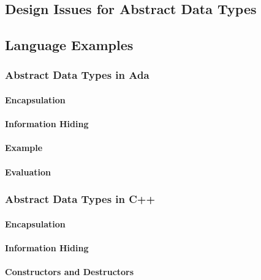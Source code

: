 \subsection{Design Issues for Abstract Data Types}\label{subsec:Abstract_Data_Type_Design_Issues}

\subsection{Language Examples}\label{subsec:Abstract_Data_Type_Lang_Examples}
\subsubsection{Abstract Data Types in Ada}\label{subsubsec:Abstract_Data_Types_Ada}
\paragraph{Encapsulation}\label{par:Ada_Encapsulation}
\paragraph{Information Hiding}\label{par:Ada_Info_Hiding}
\paragraph{Example}\label{par:Ada_Abstract_Data_Type_Example}
\paragraph{Evaluation}\label{par:Ada_Abstract_Data_Type_Evaluation}

\subsubsection{Abstract Data Types in C++}\label{subsubsec:Abstract_Data_Types_C++}
\paragraph{Encapsulation}\label{par:C++_Encapsulation}
\paragraph{Information Hiding}\label{par:C++_Info_Hiding}
\paragraph{Constructors and Destructors}\label{par:C++_Constructors_Destructors}
